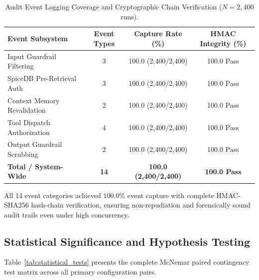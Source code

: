 \begin{table}[h]
\caption{Audit Event Logging Coverage and Cryptographic Chain Verification ($N=2{,}400$ runs).}
\label{tab:audit_completeness}
\centering
\small
\begin{tabular}{lccc}
\hline
\textbf{Event Subsystem} & \textbf{Event Types} & \textbf{Capture Rate (\%)} & \textbf{HMAC Integrity (\%)} \\
\hline
Input Guardrail Filtering & 3 & 100.0 (2,400/2,400) & 100.0 Pass \\
SpiceDB Pre-Retrieval Auth & 3 & 100.0 (2,400/2,400) & 100.0 Pass \\
Context Memory Revalidation & 2 & 100.0 (2,400/2,400) & 100.0 Pass \\
Tool Dispatch Authorization & 4 & 100.0 (2,400/2,400) & 100.0 Pass \\
Output Guardrail Scrubbing & 2 & 100.0 (2,400/2,400) & 100.0 Pass \\
\hline
\textbf{Total / System-Wide} & \textbf{14} & \textbf{100.0 (2,400/2,400)} & \textbf{100.0 Pass} \\
\hline
\end{tabular}
\end{table}

All 14 event categories achieved $100.0\%$ event capture with complete HMAC-SHA256 hash-chain verification, ensuring non-repudiation and forensically sound audit trails even under high concurrency.

\subsection{Statistical Significance and Hypothesis Testing}
\label{sec:results:significance}

Table~\ref{tab:statistical_tests} presents the complete McNemar paired contingency test matrix across all primary configuration pairs.

